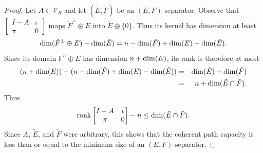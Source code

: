 \documentclass{amsart}
\theoremstyle{definition}
\begin{document}
\begin{proof}
Let $A \in \mathcal{V}_R$ and let $(\tilde{E}, \tilde{F})$ be an $(E,F)$-separator. Observe that $\left[\begin{matrix}I - A& \iota\\ \pi&0\end{matrix}\right]$ maps $\tilde{F}^\perp \oplus E$ into $\tilde{E} \oplus \{0\}$. Thus its kernel has dimension at least $${\rm dim}(\tilde{F}^\perp \oplus E) - {\rm dim}(\tilde{E}) = n - {\rm dim}(\tilde{F}) + {\rm dim}(E) - {\rm dim}(\tilde{E}).$$ Since its domain $\mathbb{F}^n \oplus E$ has dimension $n + {\rm dim}(E)$, its rank is therefore at most
\begin{eqnarray*}(n + {\rm dim}(E)) - (n - {\rm dim}(\tilde{F}) + {\rm dim}(E) - {\rm dim}(\tilde{E})) &=& {\rm dim}(\tilde{E}) + {\rm dim}(\tilde{F})\\ &=& n + {\rm dim}(\tilde{E} \cap \tilde{F}).\end{eqnarray*} Thus $${\rm rank}\left[\begin{matrix}I - A& \iota\\ \pi&0\end{matrix}\right] - n \leq {\rm dim}(\tilde{E} \cap \tilde{F}).$$ Since $A$, $\tilde{E}$, and $\tilde{F}$ were arbitrary, this shows that the coherent path capacity is less than or equal to the minimum size of an $(E,F)$-separator.


\end{proof}
\end{document}
